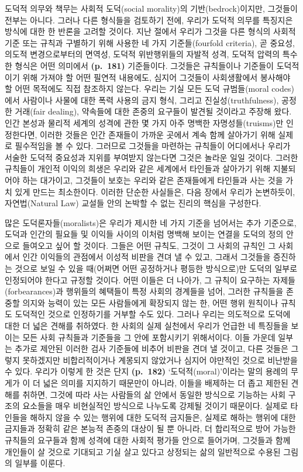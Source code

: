도덕적 의무와 책무는 사회적 도덕(social morality)의 기반(bedrock)이지만,
그것들이 전부는 아니다. 그러나 다른 형식들을 검토하기 전에, 우리가
도덕적 의무를 특징지은 방식에 대한 한 반론을 고려할 것이다. 지난 절에서
우리가 그것을 다른 형식의 사회적 기준 또는 규칙과 구별하기 위해 사용한
네 가지 기준들(fourfold criteria), 곧 중요성, 의도적 변경으로부터의
면역성, 도덕적 위반행위들의 자발적 성격, 도덕적 압력의 특수한 형식은
어떤 의미에서  \textbf{(p.~181)} 기준들이다.
그것들은 규칙들이나 기준들이 도덕적이기 위해 가져야 할 어떤 필연적
내용에도, 심지어 그것들이 사회생활에서 봉사해야 할 어떤 목적에도 직접
참조하지 않는다. 우리는 기실 모든 도덕 규범들(moral codes)에서 사람이나
사물에 대한 폭력 사용의 금지 형식, 그리고 진실성(truthfulness), 공정한
거래(fair dealing), 약속들에 대한 존중의 요구들이 발견될 것이라고 주장해
왔다. 인간 본성과 물리적 세계의 성격에 관한 몇 가지 아주 명백한
자명성들(truisms)만 인정한다면, 이러한 것들은 인간 존재들이 가까운
곳에서 계속 함께 살아가기 위해 실제로 필수적임을 볼 수 있다. 그러므로
그것들을 마련하는 규칙들이 어디에서나 우리가 서술한 도덕적 중요성과
지위를 부여받지 않는다면 그것은 놀라운 일일 것이다. 그러한 규칙들이
 개인적 이익의 희생은 우리와 같은 세계에서
타인들과 살아가기 위해 지불되어야 하는 대가이고, 그것들이
 보호는 우리와 같은 존재들에게 타인들과 사는 것을
가치 있게 만드는 최소한이다. 이러한 단순한 사실들은, 다음 장에서 우리가
논변하듯이, 자연법(Natural Law) 교설들 안의 논박할 수 없는 진리의 핵심을
구성한다.

많은 도덕론자들(moralists)은 우리가 제시한 네 가지 기준을 넘어서는 추가
기준으로, 도덕과 인간의 필요들 및 이익들 사이의 이처럼 명백해 보이는
연결을 도덕의 정의 안으로 들여오고 싶어 할 것이다. 그들은 어떤 규칙도,
그것이 그 사회의 규칙인 그 사회에서 인간 이익들의 관점에서 이성적 비판을
견뎌 낼 수 있고, 그래서 그것들을 증진하는 것으로 보일 수 있을 때(어쩌면
어떤 공정하거나 평등한 방식으로)만 도덕의 일부로 인정되어야 한다고
규정할 것이다. 어떤 이들은 더 나아가, 그 규칙이 요구하는
자제들(forbearances)과 행위들의 혜택들이 특정 사회의 경계들을 넘어,
그러한 규칙들을 존중할 의지와 능력이 있는 모든 사람들에게 확장되지 않는
한, 어떤 행위 원칙이나 규칙도 도덕적인 것으로 인정하기를 거부할 수도
있다. 그러나 우리는 의도적으로 도덕에 대한 더 넓은 견해를 취하였다. 한
사회의 실제 실천에서 우리가 언급한 네 특징들을 보이는 모든 사회 규칙들과
기준들을 그 안에 포함시키기 위해서이다. 이들 가운데 일부는 추가로 제안된
이러한 검사 기준들에 비추어 비판을 견뎌 낼 것이고, 다른 것들은 그렇지
못하겠지만 비합리적이거나 계몽되지 않았거나 심지어 야만적인 것으로
비난받을 수 있다. 우리가 이렇게 한 것은 단지 \textbf{(p.~182)}
‘도덕적(moral)’이라는 말의 용례의 무게가 이 더 넓은 의미를 지지하기
때문만이 아니라, 이들을 배제하는 더 좁고 제한된 견해를 취하면, 그것에
따라 사는 사람들의 삶 안에서 동일한 방식으로 기능하는 사회 구조의
요소들을 매우 비현실적인 방식으로 나누도록 강제될 것이기 때문이다.
실제로 타인들을 해하지 않을 수 있는 행위에 대한 도덕적 금지들은, 실제로
해하는 행위에 대한 금지들과 정확히 같은 본능적 존중의 대상이 될 뿐
아니라, 더 합리적으로 방어 가능한 규칙들의 요구들과 함께 성격에 대한
사회적 평가들 안으로 들어가며, 그것들과 함께 개인들이 살 것으로 기대되고
기실 살고 있다고 상정되는 삶의 일반적으로 수용된 그림의 일부를 이룬다.

